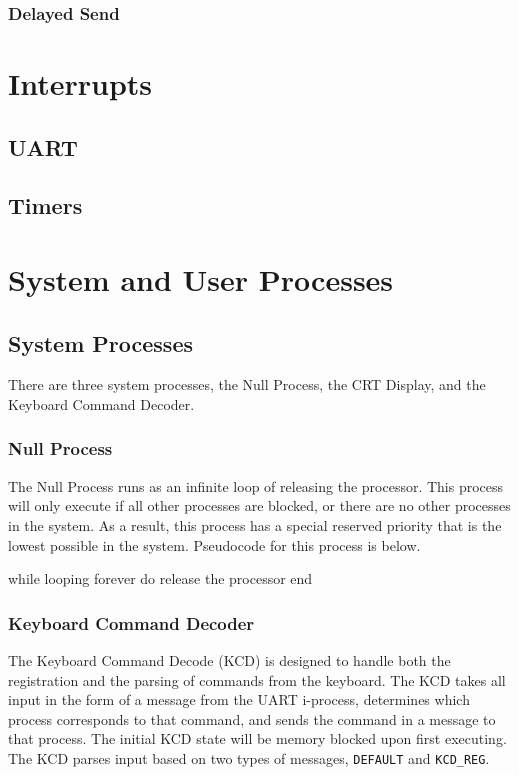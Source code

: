 \documentclass[se]{uw-wkrpt}
\begin{document}
\subsubsection{Delayed Send}

\section{Interrupts}\label{sec:interupt}

\subsection{UART}

\subsection{Timers}

\section{System and User Processes}\label{sec:proc}

\subsection{System Processes}

There are three system processes, the Null Process, the CRT Display, and the Keyboard Command Decoder.

\subsubsection{Null Process}

The Null Process runs as an infinite loop of releasing the processor. This process will only execute if all other processes are blocked, or there are no other processes in the system. As a result, this process has a special reserved priority that is the lowest possible in the system. Pseudocode for this process is below.

\begin{code}
while looping forever do
    release the processor
end
\end{code}

\subsubsection{Keyboard Command Decoder}

The Keyboard Command Decode (KCD) is designed to handle both the registration and the parsing of commands from the keyboard. The KCD takes all input in the form of a message from the UART i-process, determines which process corresponds to that command, and sends the command in a message to that process. The initial KCD state will be memory blocked upon first executing. The KCD parses input based on two types of messages, \texttt{DEFAULT} and \texttt{KCD\_REG}.
\end{document}
